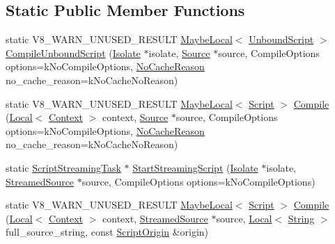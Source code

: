 \subsection*{Static Public Member Functions}
\begin{DoxyCompactItemize}
\item 
static V8\+\_\+\+W\+A\+R\+N\+\_\+\+U\+N\+U\+S\+E\+D\+\_\+\+R\+E\+S\+U\+LT \mbox{\hyperlink{classv8_1_1MaybeLocal}{Maybe\+Local}}$<$ \mbox{\hyperlink{classv8_1_1UnboundScript}{Unbound\+Script}} $>$ \mbox{\hyperlink{classv8_1_1ScriptCompiler_a4054a9857df7f2e6a8747f23108776e7}{Compile\+Unbound\+Script}} (\mbox{\hyperlink{classv8_1_1Isolate}{Isolate}} $\ast$isolate, \mbox{\hyperlink{classv8_1_1ScriptCompiler_1_1Source}{Source}} $\ast$source, Compile\+Options options=k\+No\+Compile\+Options, \mbox{\hyperlink{classv8_1_1ScriptCompiler_a7f13fa15484cfc500ae51927756e0d60}{No\+Cache\+Reason}} no\+\_\+cache\+\_\+reason=k\+No\+Cache\+No\+Reason)
\item 
static V8\+\_\+\+W\+A\+R\+N\+\_\+\+U\+N\+U\+S\+E\+D\+\_\+\+R\+E\+S\+U\+LT \mbox{\hyperlink{classv8_1_1MaybeLocal}{Maybe\+Local}}$<$ \mbox{\hyperlink{classv8_1_1Script}{Script}} $>$ \mbox{\hyperlink{classv8_1_1ScriptCompiler_a217bcf520f4ed70f6f02afeabfe60319}{Compile}} (\mbox{\hyperlink{classv8_1_1Local}{Local}}$<$ \mbox{\hyperlink{classv8_1_1Context}{Context}} $>$ context, \mbox{\hyperlink{classv8_1_1ScriptCompiler_1_1Source}{Source}} $\ast$source, Compile\+Options options=k\+No\+Compile\+Options, \mbox{\hyperlink{classv8_1_1ScriptCompiler_a7f13fa15484cfc500ae51927756e0d60}{No\+Cache\+Reason}} no\+\_\+cache\+\_\+reason=k\+No\+Cache\+No\+Reason)
\item 
static \mbox{\hyperlink{classv8_1_1ScriptCompiler_1_1ScriptStreamingTask}{Script\+Streaming\+Task}} $\ast$ \mbox{\hyperlink{classv8_1_1ScriptCompiler_a406bb44ef02d644d94bccd3f7b04f2d4}{Start\+Streaming\+Script}} (\mbox{\hyperlink{classv8_1_1Isolate}{Isolate}} $\ast$isolate, \mbox{\hyperlink{classv8_1_1ScriptCompiler_1_1StreamedSource}{Streamed\+Source}} $\ast$source, Compile\+Options options=k\+No\+Compile\+Options)
\item 
static V8\+\_\+\+W\+A\+R\+N\+\_\+\+U\+N\+U\+S\+E\+D\+\_\+\+R\+E\+S\+U\+LT \mbox{\hyperlink{classv8_1_1MaybeLocal}{Maybe\+Local}}$<$ \mbox{\hyperlink{classv8_1_1Script}{Script}} $>$ \mbox{\hyperlink{classv8_1_1ScriptCompiler_a2381d1572e778efee274caaaaa765e0c}{Compile}} (\mbox{\hyperlink{classv8_1_1Local}{Local}}$<$ \mbox{\hyperlink{classv8_1_1Context}{Context}} $>$ context, \mbox{\hyperlink{classv8_1_1ScriptCompiler_1_1StreamedSource}{Streamed\+Source}} $\ast$source, \mbox{\hyperlink{classv8_1_1Local}{Local}}$<$ \mbox{\hyperlink{classv8_1_1String}{String}} $>$ full\+\_\+source\+\_\+string, const \mbox{\hyperlink{classv8_1_1ScriptOrigin}{Script\+Origin}} \&origin)

\end{DoxyCompactItemize}
